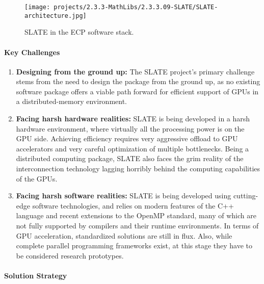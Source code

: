 \begin{figure}[htb]
    \centering
    \texttt{[image: projects/2.3.3-MathLibs/2.3.3.09-SLATE/SLATE-architecture.jpg]}
    \caption{\label{fig:slate-architecture}
    SLATE in the ECP software stack.}
\end{figure}

\paragraph{Key  Challenges}

\begin{enumerate}
\item
\textbf{Designing from the ground up:}
The SLATE project's primary challenge stems from the need to design the package
from the ground up, as no existing software package offers
a viable path forward for efficient support of GPUs
in a distributed-memory environment.
\item
\textbf{Facing harsh hardware realities:}
SLATE is being developed in a harsh hardware environment, where virtually
all the processing power is on the GPU side.
Achieving efficiency requires very aggressive offload to GPU accelerators
and very careful optimization of multiple bottlenecks.
Being a distributed computing package, SLATE also faces the grim reality
of the interconnection technology lagging horribly behind the computing
capabilities of the GPUs.
\item
\textbf{Facing harsh software realities:}
SLATE is being developed using cutting-edge software technologies,
and relies on modern features of the C++ language and recent extensions
to the OpenMP standard, many of which are not fully supported by compilers
and their runtime environments.
In terms of GPU acceleration, standardized solutions are still in flux.
Also, while complete parallel programming frameworks exist, at this stage
they have to be considered research prototypes.
\end{enumerate}

\paragraph{Solution Strategy}

